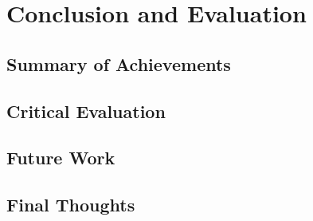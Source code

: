 \chapter{Conclusion and Evaluation}

\newpage

\section{Summary of Achievements}

\section{Critical Evaluation}

\section{Future Work}

\section{Final Thoughts}

